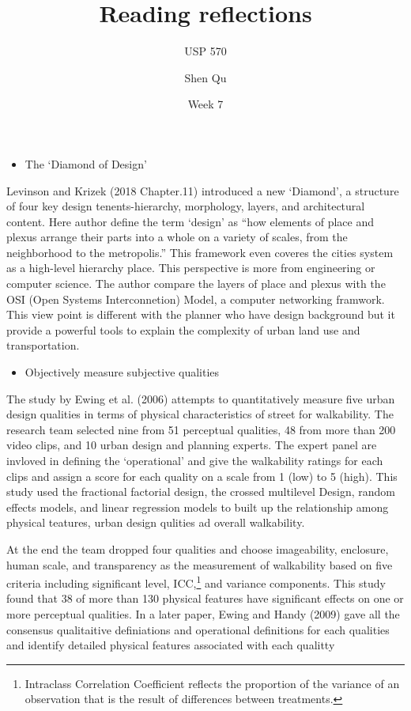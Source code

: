 \documentclass[12pt,]{article}
\title{Reading reflections}
\subtitle{USP 570}
\author{Shen Qu}
\date{Week 7}
\providecommand{\tightlist}{%
  \setlength{\itemsep}{0pt}\setlength{\parskip}{0pt}}
\let\rmarkdownfootnote\footnote%
\def\footnote{\protect\rmarkdownfootnote}
\begin{document}
\maketitle

\begin{itemize}
\tightlist
\item
  The `Diamond of Design'
\end{itemize}

Levinson and Krizek (2018 Chapter.11) introduced a new `Diamond', a
structure of four key design tenents-hierarchy, morphology, layers, and
architectural content. Here author define the term `design' as ``how
elements of place and plexus arrange their parts into a whole on a
variety of scales, from the neighborhood to the metropolis.'' This
framework even coveres the cities system as a high-level hierarchy
place. This perspective is more from engineering or computer science.
The author compare the layers of place and plexus with the OSI (Open
Systems Interconnetion) Model, a computer networking framwork. This view
point is different with the planner who have design background but it
provide a powerful tools to explain the complexity of urban land use and
transportation.

\begin{itemize}
\tightlist
\item
  Objectively measure subjective qualities
\end{itemize}

The study by Ewing et al. (2006) attempts to quantitatively measure five
urban design qualities in terms of physical characteristics of street
for walkability. The research team selected nine from 51 perceptual
qualities, 48 from more than 200 video clips, and 10 urban design and
planning experts. The expert panel are invloved in defining the
`operational' and give the walkability ratings for each clips and assign
a score for each quality on a scale from 1 (low) to 5 (high). This study
used the fractional factorial design, the crossed multilevel Design,
random effects models, and linear regression models to built up the
relationship among physical teatures, urban design qulities ad overall
walkability.

At the end the team dropped four qualities and choose imageability,
enclosure, human scale, and transparency as the measurement of
walkability based on five criteria including significant level,
ICC,\footnote{Intraclass Correlation Coefficient reflects the proportion
  of the variance of an observation that is the result of differences
  between treatments.} and variance components. This study found that 38
of more than 130 physical features have significant effects on one or
more perceptual qualities. In a later paper, Ewing and Handy (2009) gave
all the consensus qualitaitive definiations and operational definitions
for each qualities and identify detailed physical features associated
with each qualitty
\end{document}
